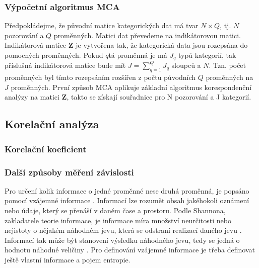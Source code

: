 \subsubsection*{Výpočetní algoritmus MCA}

Předpokládejme, že původní matice kategorických dat má tvar $N\times Q$, tj. $N$ pozorování a $Q$ proměnných. Matici dat převedeme na indikátorovou matici. Indikátorová matice  $\mathbf{Z} $ je vytvořena tak, že kategorická data jsou rozepsána do pomocných proměnných. Pokud $q$tá proměnná je má $J_q$ typů kategorií, tak příslušná indikátorová matice bude mít $J = \sum_{q=1}^{Q}J_q$ sloupců a $N$. Tzn. počet proměnných byl tímto rozepsáním rozšířen z počtu původních $Q$ proměnných na $J$ proměnných.
První způsob MCA aplikuje základní algoritmus korespondenční analýzy na matici  $\mathbf{Z}$, takto se získají souřadnice pro N pozorování a J kategorií.




\subsection{Korelační analýza}

\subsubsection{Korelační koeficient}
\subsubsection{Další způsoby měření závislosti}

Pro určení kolik informace o jedné proměnné nese druhá proměnná, je popsáno
pomocí vzájemné informace \cite{bib:MI}. Informací lze rozumět obsah jakéhokoli oznámení nebo údaje, který se přenáší v daném čase a prostoru. Podle Shannona, zakladatele teorie informace, je informace míra množství neurčitosti nebo nejistoty o nějakém náhodném jevu, která se odstraní realizací daného jevu \cite{bib:MI2}. Informací tak může být stanovení výsledku náhodného jevu, tedy se jedná o hodnotu náhodné veličiny \cite{bib:MI}. Pro definování vzájemné informace je třeba definovat ještě vlastní informace a pojem entropie.

